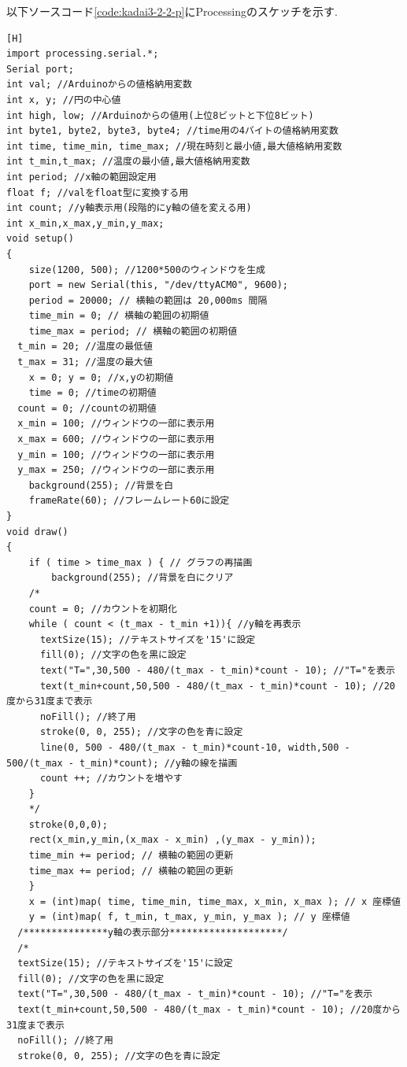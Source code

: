 \documentclass{jarticle}
\begin{document}
以下ソースコード\ref{code:kadai3-2-2-p}にProcessingのスケッチを示す.

\begin{lstlisting}[caption = 課題3.2.2(Processing),label=code:kadai3-2-2-p][H]
import processing.serial.*;
Serial port;
int val; //Arduinoからの値格納用変数
int x, y; //円の中心値
int high, low; //Arduinoからの値用(上位8ビットと下位8ビット)
int byte1, byte2, byte3, byte4; //time用の4バイトの値格納用変数
int time, time_min, time_max; //現在時刻と最小値,最大値格納用変数
int t_min,t_max; //温度の最小値,最大値格納用変数
int period; //x軸の範囲設定用
float f; //valをfloat型に変換する用
int count; //y軸表示用(段階的にy軸の値を変える用)
int x_min,x_max,y_min,y_max;
void setup()
{
	size(1200, 500); //1200*500のウィンドウを生成
	port = new Serial(this, "/dev/ttyACM0", 9600);
	period = 20000; // 横軸の範囲は 20,000ms 間隔
	time_min = 0; // 横軸の範囲の初期値
	time_max = period; // 横軸の範囲の初期値
  t_min = 20; //温度の最低値
  t_max = 31; //温度の最大値
	x = 0; y = 0; //x,yの初期値
	time = 0; //timeの初期値
  count = 0; //countの初期値
  x_min = 100; //ウィンドウの一部に表示用
  x_max = 600; //ウィンドウの一部に表示用
  y_min = 100; //ウィンドウの一部に表示用
  y_max = 250; //ウィンドウの一部に表示用
	background(255); //背景を白
	frameRate(60); //フレームレート60に設定
}
void draw()
{
	if ( time > time_max ) { // グラフの再描画
		background(255); //背景を白にクリア
    /*
    count = 0; //カウントを初期化
    while ( count < (t_max - t_min +1)){ //y軸を再表示
      textSize(15); //テキストサイズを'15'に設定
      fill(0); //文字の色を黒に設定
      text("T=",30,500 - 480/(t_max - t_min)*count - 10); //"T="を表示
      text(t_min+count,50,500 - 480/(t_max - t_min)*count - 10); //20度から31度まで表示
      noFill(); //終了用
      stroke(0, 0, 255); //文字の色を青に設定
      line(0, 500 - 480/(t_max - t_min)*count-10, width,500 - 500/(t_max - t_min)*count); //y軸の線を描画
      count ++; //カウントを増やす
    }
    */
    stroke(0,0,0);
    rect(x_min,y_min,(x_max - x_min) ,(y_max - y_min));
    time_min += period; // 横軸の範囲の更新
    time_max += period; // 横軸の範囲の更新
	}
	x = (int)map( time, time_min, time_max, x_min, x_max ); // x 座標値
	y = (int)map( f, t_min, t_max, y_min, y_max ); // y 座標値
  /***************y軸の表示部分********************/
  /*
  textSize(15); //テキストサイズを'15'に設定
  fill(0); //文字の色を黒に設定
  text("T=",30,500 - 480/(t_max - t_min)*count - 10); //"T="を表示
  text(t_min+count,50,500 - 480/(t_max - t_min)*count - 10); //20度から31度まで表示
  noFill(); //終了用
  stroke(0, 0, 255); //文字の色を青に設定

\end{lstlisting}
\end{document}
